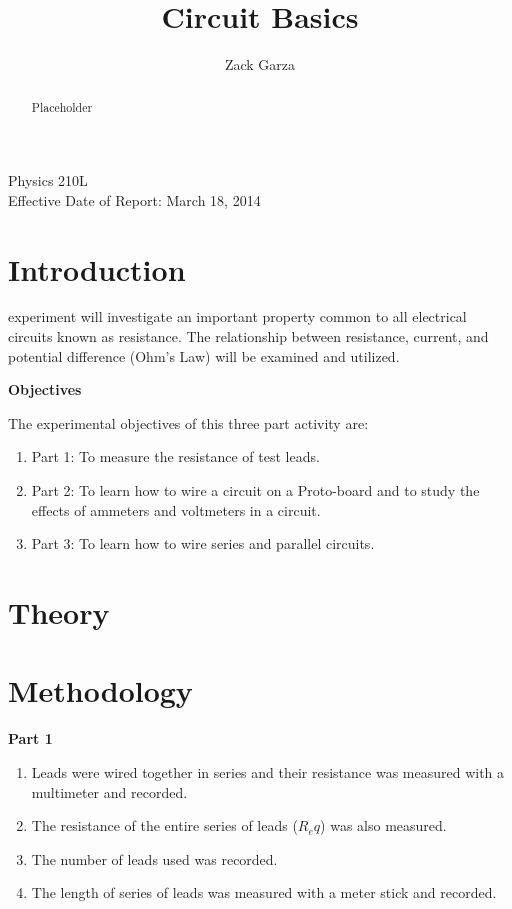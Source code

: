 \documentclass[twocolumn,english]{IEEEtran}
\theoremstyle{plain}
\theoremstyle{plain}
\begin{document}
\title{Circuit Basics}


\author{Zack Garza}


\IEEEspecialpapernotice
{Physics 210L \\
Effective Date of Report: March 18, 2014}


\maketitle
\begin{abstract}
Placeholder
\end{abstract}
\tableofcontents

\section{Introduction}
 experiment will investigate an important property common to all electrical circuits known as resistance. The relationship between resistance, current, and potential difference (Ohm's Law) will be examined and utilized.

\begin{centering}
 \textbf{Objectives}
\end{centering}
The experimental objectives of this three part activity are:
\begin{enumerate}
 \item Part 1: To measure the resistance of test leads.
 \item Part 2: To learn how to wire a circuit on a Proto-board and to study the effects of ammeters and voltmeters in a circuit.
 \item Part 3: To learn how to wire series and parallel circuits.
\end{enumerate}


\section{Theory}

\section{Methodology}
\textbf{Part 1}
\begin{enumerate}
 \item Leads were wired together in series and their resistance was measured with a multimeter and recorded.
 \item The resistance of the entire series of leads ($R_eq$) was also measured.
 \item The number of leads used was recorded.
 \item The length of series of leads was measured with a meter stick and recorded.
\end{enumerate}
\end{document}
